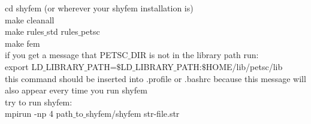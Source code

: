 	cd shyfem (or wherever your shyfem installation is)\\
	make cleanall\\
	make rules$\_$std rules$\_$petsc\\
	make fem\\

if you get a message that PETSC$\_$DIR is not in the library path run:\\

	export LD$\_$LIBRARY$\_$PATH=$\$$LD$\_$LIBRARY$\_$PATH:$\$$HOME/lib/petsc/lib \\

	this command should be inserted into .profile or .bashrc because this message will also appear every time you run shyfem\\

try to run shyfem:\\

	mpirun -np 4 path$\_$to$\_$shyfem/shyfem str-file.str\\


